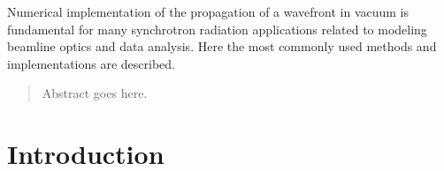 \documentclass{iucr}              %
\begin{document}



\maketitle                        %

\begin{synopsis}
Numerical implementation of the propagation of a wavefront in vacuum is fundamental for many synchrotron radiation applications related to modeling beamline optics and data analysis. Here the most commonly used methods and implementations are described. 
\end{synopsis}

\begin{abstract}
Abstract goes here.
\end{abstract}



\section{Introduction}
\label{ch:intro}
\end{document}
